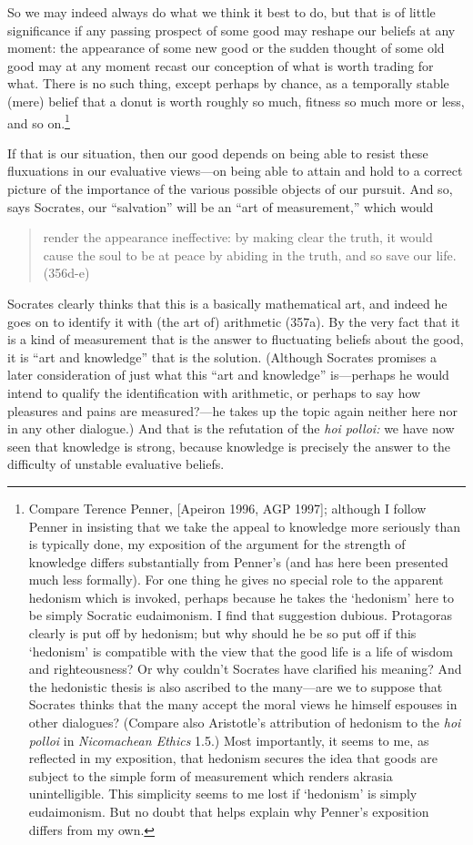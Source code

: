 \documentclass[11pt]{amsart}
\begin{document}
So we may indeed always do what we think it best to do, but that is of little significance if any passing prospect of some good may reshape our beliefs at any moment: the appearance of some new good or the sudden thought of some old good may at any moment recast our conception of what is worth trading for what. There is no such thing, except perhaps by chance, as a temporally stable (mere) belief that a donut is worth roughly so much, fitness so much more or less, and so on.\footnote{Compare Terence Penner, [Apeiron 1996, AGP 1997]; although I follow Penner in insisting that we take the appeal to knowledge more seriously than is typically done, my exposition of the argument for the strength of knowledge differs substantially from Penner's (and has here been presented much less formally). For one thing he gives no special role to the apparent hedonism which is invoked, perhaps because he takes the `hedonism' here to be simply Socratic eudaimonism. I find that suggestion dubious. Protagoras clearly is put off by hedonism; but why should he be so put off if this `hedonism' is compatible with the view that the good life is a life of wisdom and righteousness? Or why couldn't Socrates have clarified his meaning? And the hedonistic thesis is also ascribed to the many---are we to suppose that Socrates thinks that the many accept the moral views he himself espouses in other dialogues? (Compare also Aristotle's attribution of hedonism to the \emph{hoi polloi} in \emph{Nicomachean Ethics} 1.5.) Most importantly, it seems to me, as reflected in my exposition, that hedonism secures the idea that goods are subject to the simple form of measurement which renders akrasia unintelligible. This simplicity seems to me lost if `hedonism' is simply eudaimonism. But no doubt that helps explain why Penner's exposition differs from my own.}

If that is our situation, then our good depends on being able to resist these fluxuations in our evaluative views---on being able to attain and hold to a correct picture of the importance of the various possible objects of our pursuit. And so, says Socrates, our ``salvation'' will be an ``art of measurement,'' which would \begin{quote} render the appearance ineffective: by making clear the truth, it would cause the soul to be at peace by abiding in the truth, and so save our life. (356d-e)\end{quote} Socrates clearly thinks that this is a basically mathematical art, and indeed he goes on to identify it with (the art of) arithmetic (357a). By the very fact that it is a kind of measurement that is the answer to fluctuating beliefs about the good, it is ``art and knowledge'' that is the solution. (Although Socrates promises a later consideration of just what this ``art and knowledge'' is---perhaps he would intend to qualify the identification with arithmetic, or perhaps to say how pleasures and pains are measured?---he takes up the topic again neither here nor in any other dialogue.) And that is the refutation of the \emph{hoi polloi:} we have now seen that knowledge is strong, because knowledge is precisely the answer to the difficulty of unstable evaluative beliefs.
\end{document}
